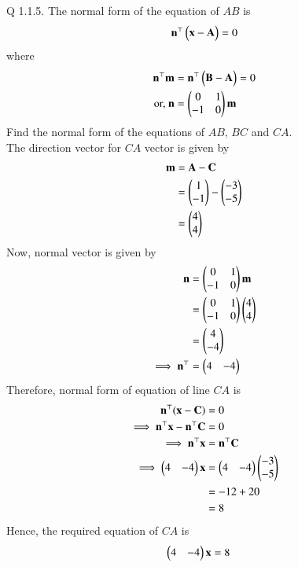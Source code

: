 \documentclass[12pt]{article}
\begin{document}
\let\vec\mathbf
\fi
Q 1.1.5. The normal form of the equation of $AB$ is
\begin{align}
\vec{n}^{\top}\myvec{\vec{x}-\vec{A}} = 0
\end{align}
where
\begin{align}
\vec{n}^{\top}\vec{m} &= \vec{n}^{\top}\myvec{\vec{B} - \vec{A}} = 0 \\
\text{or, } \vec{n} &= \myvec{0&1 \\ -1&0} \vec{m}
\end{align}
Find the normal form of the equations of $AB$, $BC$ and $CA$.\\
\solution
The direction vector for $CA$ vector is given by
\begin{align}
\vec{m} &= \vec{A} - \vec{C}\\
&= \myvec{1 \\ -1} - \myvec{-3 \\ -5}\\
&= \myvec{4 \\ 4}
\end{align}
Now, normal vector is given by
\begin{align}
\vec{n} &= \myvec{0&1 \\ -1&0}\vec{m}\\
&= \myvec{0&1 \\ -1&0}\myvec{4 \\ 4}\\
&= \myvec{4 \\ -4}\\
\implies \vec{n}^{\top} &= \myvec{4&-4}
\end{align}
Therefore, normal form of equation of line $CA$ is
\begin{align}
\vec{n}^{\top}(\vec{x} - \vec{C}) &= 0 \\
\implies \vec{n}^{\top}{\vec{x}} - \vec{n}^{\top}{\vec{C}} &= 0 \\
\implies \vec{n}^{\top}{\vec{x}} &= \vec{n}^{\top}{\vec{C}} \\
\implies \myvec{4&-4}{\vec{x}} &= \myvec{4&-4}\myvec{-3 \\ -5} \\
&= -12 + 20 \\
&= 8 
\end{align}
Hence, the required equation of $CA$ is
\begin{align}
\label{eq:CA}
\myvec{4&-4}{\vec{x}} &= 8 
\end{align}
\end{document}
